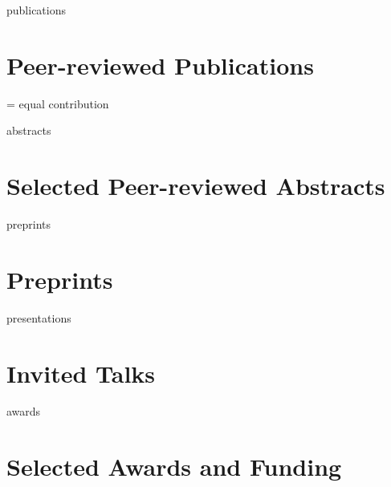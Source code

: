 \documentclass[12pt]{report} %
\begin{document}
\ifcsname publications\endcsname%
\section{Peer-reviewed Publications}
\publications{}
{\footnotesize* = equal contribution}
\fi



\ifcsname abstracts\endcsname%
\section{Selected Peer-reviewed Abstracts}
\abstracts{}
\fi



\ifcsname preprints\endcsname%
\section{Preprints}
\preprints{}
\fi



\ifcsname presentations\endcsname%
\section{Invited Talks}
\presentations{}
\fi



\ifcsname awards\endcsname%
\section{Selected Awards and Funding}
\awards{}
\fi


\end{document}
